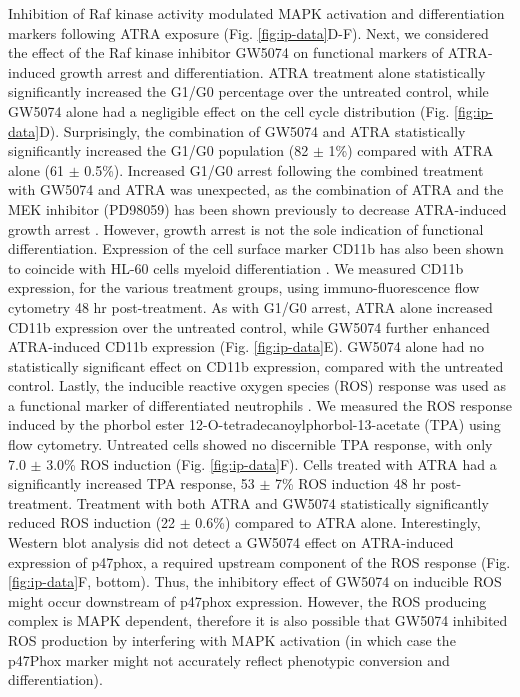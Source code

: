 \documentclass[12pt]{article}
\begin{document}

Inhibition of Raf kinase activity modulated MAPK activation and differentiation markers following ATRA exposure (Fig. \ref{fig:ip-data}D-F).
Next, we considered the effect of the Raf kinase inhibitor GW5074 on functional markers of ATRA-induced growth arrest and differentiation.
ATRA treatment alone statistically significantly increased the G1/G0 percentage over the untreated control,
while GW5074 alone had a negligible effect on the cell cycle distribution (Fig. \ref{fig:ip-data}D).
Surprisingly, the combination of GW5074 and ATRA statistically significantly increased the G1/G0 population (82 $\pm$ 1\%)
compared with ATRA alone (61 $\pm$ 0.5\%).
Increased G1/G0 arrest following the combined treatment with GW5074 and ATRA was unexpected,
as the combination of ATRA and the MEK inhibitor (PD98059) has been shown previously to decrease ATRA-induced growth arrest \cite{Yen1998}.
However, growth arrest is not the sole indication of functional differentiation.
Expression of the cell surface marker CD11b has also been shown to coincide with HL-60 cells myeloid differentiation \cite{Hickstein1989}.
We measured CD11b expression, for the various treatment groups, using immuno-fluorescence flow cytometry 48 hr post-treatment.
As with G1/G0 arrest, ATRA alone increased CD11b expression over the untreated control,
while GW5074 further enhanced ATRA-induced CD11b expression (Fig. \ref{fig:ip-data}E).
GW5074 alone had no statistically significant effect on CD11b expression, compared with the untreated control.
Lastly, the inducible reactive oxygen species (ROS) response was used as a functional marker of differentiated neutrophils \cite{Congleton2011}.
We measured the ROS response induced by the phorbol ester 12-O-tetradecanoylphorbol-13-acetate (TPA) using flow cytometry.
Untreated cells showed no discernible TPA response,
with only 7.0 $\pm$ 3.0\% ROS induction (Fig. \ref{fig:ip-data}F).
Cells treated with ATRA had a significantly increased TPA response, 53 $\pm$ 7\% ROS induction 48 hr post-treatment.
Treatment with both ATRA and GW5074 statistically significantly reduced ROS induction (22 $\pm$ 0.6\%) compared to ATRA alone.
Interestingly, Western blot analysis did not detect a GW5074 effect on ATRA-induced expression of p47phox,
a required upstream component of the ROS response  (Fig. \ref{fig:ip-data}F, bottom).
Thus, the inhibitory effect of GW5074 on inducible ROS might occur downstream of p47phox expression.
However, the ROS producing complex is MAPK dependent,
therefore it is also possible that GW5074 inhibited ROS production by interfering
with MAPK activation (in which case the p47Phox marker might not accurately reflect phenotypic conversion and differentiation).
\end{document}

